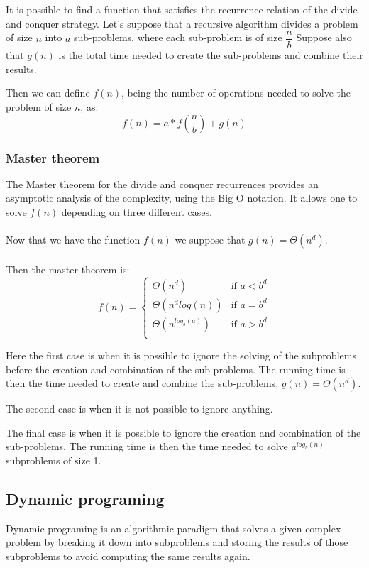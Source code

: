It is possible to find a function that satisfies the recurrence relation of the divide and conquer strategy.
Let's suppose that a recursive algorithm divides a problem of size $n$ into $a$ sub-problems, where each sub-problem is of size $\dfrac{n}{b}$
Suppose also that $g(n)$ is the total time needed to create the sub-problems and combine their results.

Then we can define $f(n)$, being the number of operations needed to solve the problem of size $n$, as:
$$
f(n) = a * f(\dfrac{n}{b}) + g(n)
$$

\subsubsection{Master theorem}

The Master theorem for the divide and conquer recurrences provides an asymptotic analysis of the complexity, using the Big O notation.
It allows one to solve $f(n)$ depending on three different cases.
\\
\\
Now that we have the function $f(n)$ we suppose that $g(n) = \Theta(n^d)$.
\\
\\
Then the master theorem is:
$$
f(n) = 
\begin{cases}
    \Theta(n^d) &\text{if } a < b^d\\
    \Theta(n^dlog(n)) &\text{if } a = b^d\\
    \Theta(n^{log_b(a)}) &\text{if } a > b^d\\
\end{cases}
$$

Here the first case is when it is possible to ignore the solving of the subproblems before the creation and combination of the sub-problems. The running time is then the time needed to create and combine the sub-problems, $g(n) = \Theta(n^d)$.

The second case is when it is not possible to ignore anything.

The final case is when it is possible to ignore the creation and combination of the sub-problems. The running time is then the time needed to solve $a^{log_b(n)}$ subproblems of size 1.

\subsection{Dynamic programing}

Dynamic programing is an algorithmic paradigm that solves a given complex problem by breaking it down into subproblems and storing the results of those subproblems to avoid computing the same results again.

